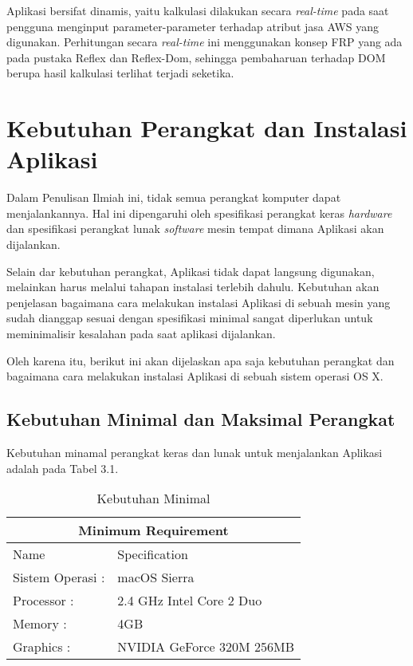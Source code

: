 \documentclass[pi.tex]{subfile}
\begin{document}
Aplikasi bersifat dinamis, yaitu kalkulasi dilakukan secara \emph{real-time} pada saat pengguna menginput parameter-parameter terhadap atribut jasa AWS yang digunakan. Perhitungan secara \emph{real-time} ini menggunakan konsep FRP yang ada pada pustaka Reflex dan Reflex-Dom, sehingga pembaharuan terhadap DOM berupa hasil kalkulasi terlihat terjadi seketika.

\section{Kebutuhan Perangkat dan Instalasi Aplikasi}
Dalam Penulisan Ilmiah ini, tidak semua perangkat komputer dapat menjalankannya. Hal ini dipengaruhi oleh spesifikasi perangkat keras \emph{hardware} dan spesifikasi perangkat lunak \emph{software} mesin tempat dimana Aplikasi akan dijalankan.

Selain dar kebutuhan perangkat, Aplikasi tidak dapat langsung digunakan, melainkan harus melalui tahapan instalasi terlebih dahulu. Kebutuhan akan penjelasan bagaimana cara melakukan instalasi Aplikasi di sebuah mesin yang sudah dianggap sesuai dengan spesifikasi minimal sangat diperlukan untuk meminimalisir kesalahan pada saat aplikasi dijalankan.

Oleh karena itu, berikut ini akan dijelaskan apa saja kebutuhan perangkat dan bagaimana cara melakukan instalasi Aplikasi di sebuah sistem operasi OS X.
\subsection{Kebutuhan Minimal dan Maksimal Perangkat}\hspace{5pt}
Kebutuhan minamal perangkat keras dan lunak untuk menjalankan Aplikasi adalah pada Tabel 3.1.

\begin{table}[h]
  \centering
\begin{tabular}{ |p{3cm}||p{6cm}|}
  
  \hline
  \multicolumn{2}{|c|}{Minimum Requirement} 
  \\ \hline
  Name & Specification \\
  \hline
  Sistem Operasi : & macOS Sierra \\
  Processor : & 2.4 GHz Intel Core 2 Duo \\
  Memory : & 4GB \\
  Graphics : & NVIDIA GeForce 320M 256MB \\
  \hline
  
\end{tabular}
\caption{Kebutuhan Minimal}
\end{table}
\end{document}
